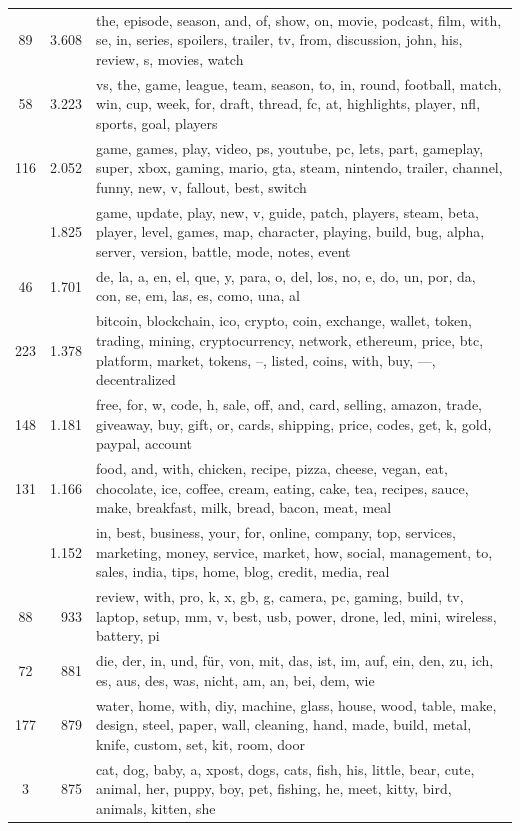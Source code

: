 \documentclass[11pt,a4paper,twoside]{article}
\begin{document}
\begin{longtable}[t]{cr >{\raggedright\arraybackslash}p{}}
89 & 3.608 & the, episode, season, and, of, show, on, movie, podcast, film, with, se, in, series, spoilers, trailer, tv, from, discussion, john, his, review, s, movies, watch\\
58 & 3.223 & vs, the, game, league, team, season, to, in, round, football, match, win, cup, week, for, draft, thread, fc, at, highlights, player, nfl, sports, goal, players\\
116 & 2.052 & game, games, play, video, ps, youtube, pc, lets, part, gameplay, super, xbox, gaming, mario, gta, steam, nintendo, trailer, channel, funny, new, v, fallout, best, switch\\
\addlinespace
21 & 1.825 & game, update, play, new, v, guide, patch, players, steam, beta, player, level, games, map, character, playing, build, bug, alpha, server, version, battle, mode, notes, event\\
46 & 1.701 & de, la, a, en, el, que, y, para, o, del, los, no, e, do, un, por, da, con, se, em, las, es, como, una, al\\
223 & 1.378 & bitcoin, blockchain, ico, crypto, coin, exchange, wallet, token, trading, mining, cryptocurrency, network, ethereum, price, btc, platform, market, tokens, –, listed, coins, with, buy, —, decentralized\\
148 & 1.181 & free, for, w, code, h, sale, off, and, card, selling, amazon, trade, giveaway, buy, gift, or, cards, shipping, price, codes, get, k, gold, paypal, account\\
131 & 1.166 & food, and, with, chicken, recipe, pizza, cheese, vegan, eat, chocolate, ice, coffee, cream, eating, cake, tea, recipes, sauce, make, breakfast, milk, bread, bacon, meat, meal\\
\addlinespace
117 & 1.152 & in, best, business, your, for, online, company, top, services, marketing, money, service, market, how, social, management, to, sales, india, tips, home, blog, credit, media, real\\
88 & 933 & review, with, pro, k, x, gb, g, camera, pc, gaming, build, tv, laptop, setup, mm, v, best, usb, power, drone, led, mini, wireless, battery, pi\\
72 & 881 & die, der, in, und, für, von, mit, das, ist, im, auf, ein, den, zu, ich, es, aus, des, was, nicht, am, an, bei, dem, wie\\
177 & 879 & water, home, with, diy, machine, glass, house, wood, table, make, design, steel, paper, wall, cleaning, hand, made, build, metal, knife, custom, set, kit, room, door\\
3 & 875 & cat, dog, baby, a, xpost, dogs, cats, fish, his, little, bear, cute, animal, her, puppy, boy, pet, fishing, he, meet, kitty, bird, animals, kitten, she\\

\end{longtable}
\end{document}
